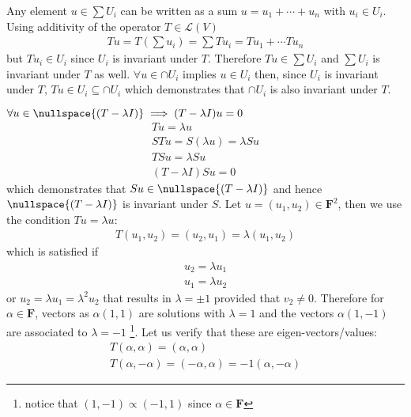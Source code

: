 \exo{}Any element $u\in \sum U_i$ can be written as a sum $u = u_1 + \cdots + u_n$ with $u_i\in U_i$. Using additivity of the operator  $T\in\mathcal{L}(V)$
\begin{align*}
Tu = T(\sum u_i) = \sum Tu_i = Tu_1 + \cdots T u_n
\end{align*}
but $Tu_i\in U_i$ since $U_i$ is invariant under $T$. Therefore $Tu\in \sum U_i$ and $\sum U_i$ is invariant under $T$ as well.
\exo{} $\forall u\in \cap U_i$ implies $u\in U_i$ then, since $U_i$ is invariant under $T$, $Tu\in U_i\subseteq\cap U_i$ which demonstrates that $\cap U_i$ is also invariant under $T$.
\exo{} 

\exo{} $\forall u\in\nullspace{(T-\lambda I)} \implies (T-\lambda I)u = 0$
\begin{align*}
Tu=\lambda u \\
STu =S(\lambda u) = \lambda Su \\
TSu = \lambda Su \\
(T-\lambda I) Su = 0 
\end{align*}
which demonstrates that $Su\in\nullspace{(T-\lambda I)}$ and hence $\nullspace{(T-\lambda I)}$ is invariant under $S$.
\exo{}Let $u=(u_1,u_2)\in \mathbf{F}^2$, then we use the condition $Tu=\lambda u$:
\begin{align*}
T(u_1,u_2) = (u_2, u_1) = \lambda(u_1,u_2)
\end{align*}
which is satisfied if
\begin{align*}
u_2 = \lambda u_1 \\
u_1 = \lambda u_2
\end{align*}
or $u_2 = \lambda u_1 = \lambda^2 u_2$ that results in $\lambda=\pm 1$ provided that $v_2\neq 0$. Therefore for $\alpha\in \mathbf{F}$, vectors as $\alpha(1,1)$ are solutions with $\lambda=1$ and the vectors $\alpha(1,-1)$ are associated to $\lambda = -1$ \footnote{notice that $(1,-1) \propto (-1,1)$ since $\alpha\in \mathbf{F}$}. Let us verify that these are eigen-vectors/values:
\begin{align*}
T(\alpha,\alpha) = (\alpha,\alpha) \\
T(\alpha,-\alpha) = (-\alpha,\alpha) = -1(\alpha,-\alpha)
\end{align*}

